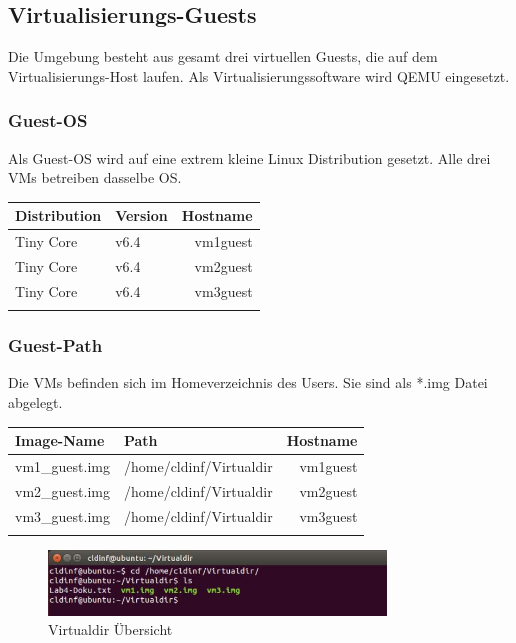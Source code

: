 \documentclass[a4,12pt]{scrartcl}
\begin{document}
\subsection{Virtualisierungs-Guests}
Die Umgebung besteht aus gesamt drei virtuellen Guests, die auf dem Virtualisierungs-Host laufen. Als Virtualisierungssoftware wird QEMU eingesetzt. 

\subsubsection{Guest-OS}
Als Guest-OS wird auf eine extrem kleine Linux Distribution gesetzt. Alle drei VMs betreiben dasselbe OS. 
\begin{center}
    \begin{tabular}{@{} l l r@{}}\toprule    
    {Distribution} & {Version} & {Hostname}\\ \toprule
    Tiny Core & v6.4 & vm1guest\\ 
    Tiny Core & v6.4 & vm2guest\\
    Tiny Core & v6.4 & vm3guest\\ \addlinespace
    \bottomrule
    \end{tabular}
\end{center}

\subsubsection{Guest-Path}
Die VMs befinden sich im Homeverzeichnis des Users. Sie sind als *.img Datei abgelegt.
\begin{center}
    \begin{tabular}{@{} l l r@{}}\toprule    
    {Image-Name} & {Path} & {Hostname}\\ \toprule
    vm1\_guest.img & /home/cldinf/Virtualdir & vm1guest\\ 
    vm2\_guest.img & /home/cldinf/Virtualdir & vm2guest\\
    vm3\_guest.img & /home/cldinf/Virtualdir & vm3guest\\ \addlinespace
    \bottomrule
    \end{tabular}
\end{center}

\begin{figure} [H]
	\begin{center}
	\includegraphics[width=0.80\textwidth]{./pictures/virtualdir.jpg}
	\caption{{Virtualdir Übersicht}}
	\label{virtualdir}
	\end{center}
\end{figure}
\end{document}
